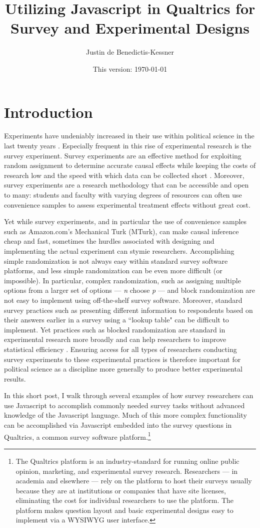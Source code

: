 \documentclass[12pt]{article}
\title{Utilizing Javascript in Qualtrics for Survey and Experimental Designs}
\author{Justin de Benedictis-Kessner}
\date{This version: \today}                                           %
\begin{document}
\maketitle
\section{Introduction}

Experiments have undeniably increased in their use within political science in the last twenty years \citep{druckman2006growth}. Especially frequent in this rise of experimental research is the survey experiment. Survey experiments are an effective method for exploiting random assignment to determine accurate causal effects while keeping the costs of research low and the speed with which data can be collected short \citep{mullinix2015generalizability}. Moreover, survey experiments are a research methodology that can be accessible and open to many: students and faculty with varying degrees of resources can often use convenience samples to assess experimental treatment effects without great cost.

Yet while survey experiments, and in particular the use of convenience samples such as Amazon.com's Mechanical Turk (MTurk), can make causal inference cheap and fast, sometimes the hurdles associated with designing and implementing the actual experiment can stymie researchers. Accomplishing simple randomization is not always easy within standard survey software platforms, and less simple randomization can be even more difficult (or impossible). In particular, complex randomization, such as assigning multiple options from a larger set of options --- \emph{n} choose \emph{p} --- and block randomization are not easy to implement using off-the-shelf survey software. Moreover, standard survey practices such as presenting different information to respondents based on their answers earlier in a survey using a ``lookup table" can be difficult to implement. Yet practices such as blocked randomization are standard in experimental research more broadly and can help researchers to improve statistical efficiency \citep[e.g.,][]{horiuchi2007designing, imai2008misunderstandings, moore2012multivariate}. Ensuring access for all types of researchers conducting survey experiments to these experimental practices is therefore important for political science as a discipline more generally to produce better experimental results.

In this short post, I walk through several examples of how survey researchers can use Javascript to accomplish commonly needed survey tasks without advanced knowledge of the Javascript language. Much of this more complex functionality can be accomplished via Javascript embedded into the survey questions in Qualtrics, a common survey software platform.\footnote{The Qualtrics platform is an industry-standard for running online public opinion, marketing, and experimental survey research. Researchers --- in academia and elsewhere ---  rely on the platform to host their surveys usually because they are at institutions or companies that have site licenses, eliminating the cost for individual researchers to use the platform. The platform makes question layout and basic experimental designs easy to implement via a WYSIWYG user interface.}
\end{document}
